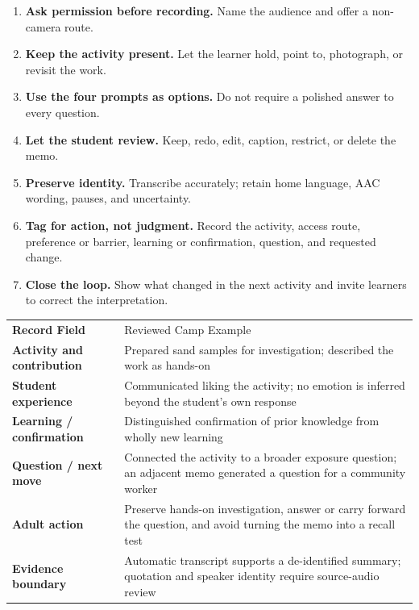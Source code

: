 \begin{enumerate}
  \item \textbf{Ask permission before recording.} Name the audience and offer a non-camera route.
  \item \textbf{Keep the activity present.} Let the learner hold, point to, photograph, or revisit the work.
  \item \textbf{Use the four prompts as options.} Do not require a polished answer to every question.
  \item \textbf{Let the student review.} Keep, redo, edit, caption, restrict, or delete the memo.
  \item \textbf{Preserve identity.} Transcribe accurately; retain home language, AAC wording, pauses, and uncertainty.
  \item \textbf{Tag for action, not judgment.} Record the activity, access route, preference or barrier, learning or confirmation, question, and requested change.
  \item \textbf{Close the loop.} Show what changed in the next activity and invite learners to correct the interpretation.
\end{enumerate}


\renewcommand{\arraystretch}{1.00}
\setlength{\tabcolsep}{4pt}

\begin{tabularx}{\textwidth}{
>{\bfseries\RaggedRight\arraybackslash}p{2.0in}
>{\RaggedRight\arraybackslash}X}

\rowcolor{MidTeal}
\color{white}Record Field &
\color{white}Reviewed Camp Example \\

Activity and contribution &
Prepared sand samples for investigation; described the work as hands-on \\

\rowcolor{SoftGray}
Student experience &
Communicated liking the activity; no emotion is inferred beyond the student's own response \\

Learning / confirmation &
Distinguished confirmation of prior knowledge from wholly new learning \\

\rowcolor{SoftGray}
Question / next move &
Connected the activity to a broader exposure question; an adjacent memo generated a question for a community worker \\

Adult action &
Preserve hands-on investigation, answer or carry forward the question, and avoid turning the memo into a recall test \\

\rowcolor{SoftGray}
Evidence boundary &
Automatic transcript supports a de-identified summary; quotation and speaker identity require source-audio review \\

\end{tabularx}

